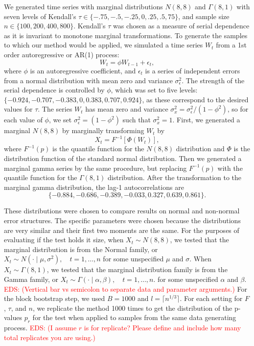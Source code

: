 \documentclass[APA,Times1COL]{WileyNJDv5} %
\newcommand{\eds}[1]{\textcolor{red}{EDS: (#1)}}
\begin{document}
We generated time series with marginal distributions $N(8, 8)$ and
$\Gamma(8, 1)$ with seven levels of Kendall's
$\tau \in \{-.75, -.5, -.25, 0, .25, .5, 75\}$, and
sample size $n \in \{100, 200, 400, 800\}$. Kendall's $\tau$ was chosen as a
measure of serial dependence as it is invariant to monotone marginal
transformations. To generate the samples to which our
method would be applied, we simulated a time series $W_t$ from a 1st 
order autoregressive or AR(1) process:
\begin{equation*}
W_t = \phi W_{t-1} + \epsilon_t,
\end{equation*}
where $\phi$ is an autoregressive coefficient, and $\epsilon_t$ is a series of
independent errors from a normal distribution with mean zero and variance
$\sigma_{\epsilon}^2$. The strength of the serial dependence is controlled by
$\phi$, which was set to five levels: 
$\{-0.924, -0.707, -0.383, 0, 0.383, 0.707, 0.924\}$, as these
correspond to the desired values for $\tau$. The 
series $W_t$ has mean zero and variance 
$\sigma_x^2 = \sigma_{\epsilon}^2 / (1 - \phi^2)$, so for each value of
$\phi$,  we 
set $\sigma_{\epsilon}^2 = (1 - \phi^2)$ such that $\sigma_x^2 = 1$.
First, we generated a
marginal $N(8, 8)$ by marginally transforming $W_t$ by
\begin{equation*}
X_t = F^{-1}[\Phi(W_t)],
\end{equation*}
where $F^{-1}(p)$ is the quantile function for the $N(8, 8)$ 
distribution and $\Phi$ is the distribution function of the standard normal
distribution.
Then we generated a marginal gamma series by the same procedure, but
replacing $F^{-1}(p)$ with the quantile function for the $\Gamma(8, 1)$
distribution.
After the transformation
to the marginal gamma distribution, the lag-1 autocorrelations are
\[
  \{-0.884, -0.686, -0.389, -0.033, 0.327, 0.639, 0.861\}.
\]


These distributions
were chosen to compare results on normal and non-normal
error structures. The specific parameters were chosen because the distributions 
are very similar and their
first two moments are the same. 
For the purposes of 
evaluating if the test holds it size, when $X_t \sim N(8, 8)$, we tested that the 
marginal distribution is from the
Normal family, or 
$X_t \sim N(\cdot \mid \mu, \sigma^2), \quad t = 1, \ldots, n$
for some unspecified $\mu$ and $\sigma$. When $X_t \sim \Gamma(8, 1)$, we tested
that the marginal distribution family is from the Gamma family,
or
$X_t \sim \Gamma(\cdot \mid \alpha, \beta), \quad t = 1, \ldots, n$.
for some unspecified $\alpha$ and $\beta$.
\eds{Vertical bar vs semicolon to separate data and parameter arguments.}
For the block
bootstrap step,
we used $B = 1000$ and $l = \lceil n^{1/3} \rceil$.
For each setting for $F$, $\tau$, and $n$, we replicate the method 1000 times 
to get the distribution of the p-values $p_r$
for the test when applied to samples from the same data generating process.
\eds{I assume $r$ is for replicate?  Please define and include how many 
total replicates you are using.}
\end{document}

